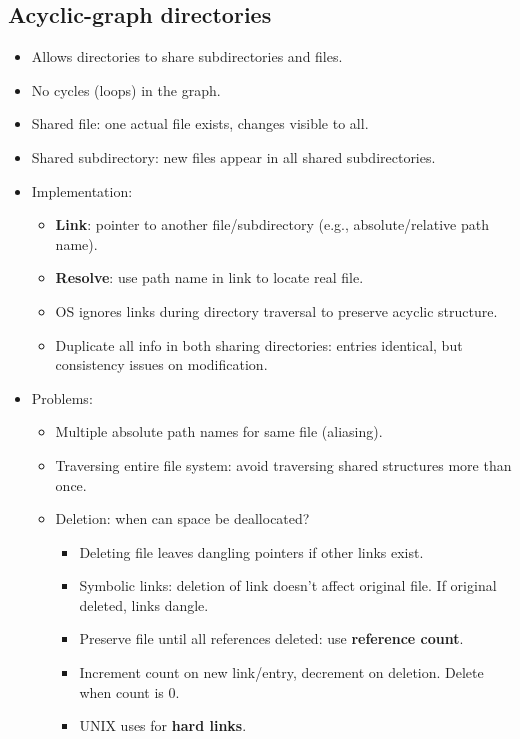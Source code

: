 \subsection{Acyclic-graph directories}
\begin{itemize}
    \item Allows directories to share subdirectories and files.
    \item No cycles (loops) in the graph.
    \item Shared file: one actual file exists, changes visible to all.
    \item Shared subdirectory: new files appear in all shared subdirectories.
    \item Implementation:
    \begin{itemize}
        \item \textbf{Link}: pointer to another file/subdirectory (e.g., absolute/relative path name).
        \item \textbf{Resolve}: use path name in link to locate real file.
        \item OS ignores links during directory traversal to preserve acyclic structure.
        \item Duplicate all info in both sharing directories: entries identical, but consistency issues on modification.
    \end{itemize}
    \item Problems:
    \begin{itemize}
        \item Multiple absolute path names for same file (aliasing).
        \item Traversing entire file system: avoid traversing shared structures more than once.
        \item Deletion: when can space be deallocated?
        \begin{itemize}
            \item Deleting file leaves dangling pointers if other links exist.
            \item Symbolic links: deletion of link doesn't affect original file. If original deleted, links dangle.
            \item Preserve file until all references deleted: use \textbf{reference count}.
            \item Increment count on new link/entry, decrement on deletion. Delete when count is 0.
            \item UNIX uses for \textbf{hard links}.
        \end{itemize}
    \end{itemize}
\end{itemize}

